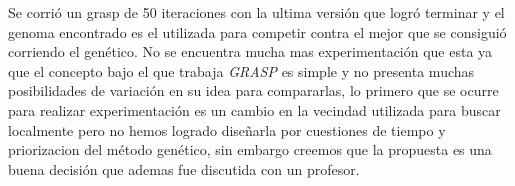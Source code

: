 Se corrió un grasp de 50 iteraciones con la ultima versión  que logró terminar y el genoma encontrado es el utilizada para competir
contra el mejor que se consiguió corriendo el genético. No se encuentra mucha mas experimentación que esta ya que el concepto
bajo el que trabaja \emph{GRASP} es simple y no presenta muchas posibilidades de variación en su idea para compararlas,
lo primero que se ocurre para realizar experimentación es un cambio en la vecindad utilizada para buscar localmente
 pero no hemos logrado diseñarla por cuestiones de tiempo y priorizacion del método genético, sin embargo
creemos que la propuesta es una buena decisión que ademas fue discutida con un profesor.
